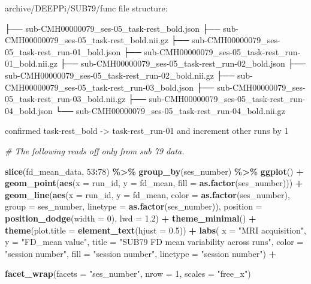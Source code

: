 \documentclass[
]{article}
\newenvironment{Shaded}{\begin{snugshade}}{\end{snugshade}}
\newcommand{\AttributeTok}[1]{\textcolor[rgb]{0.13,0.29,0.53}{#1}}
\newcommand{\CommentTok}[1]{\textcolor[rgb]{0.56,0.35,0.01}{\textit{#1}}}
\newcommand{\DecValTok}[1]{\textcolor[rgb]{0.00,0.00,0.81}{#1}}
\newcommand{\FloatTok}[1]{\textcolor[rgb]{0.00,0.00,0.81}{#1}}
\newcommand{\FunctionTok}[1]{\textcolor[rgb]{0.13,0.29,0.53}{\textbf{#1}}}
\newcommand{\NormalTok}[1]{#1}
\newcommand{\SpecialCharTok}[1]{\textcolor[rgb]{0.81,0.36,0.00}{\textbf{#1}}}
\newcommand{\StringTok}[1]{\textcolor[rgb]{0.31,0.60,0.02}{#1}}
\begin{document}
archive/DEEPPi/SUB79/func file structure:

├── sub-CMH00000079\_ses-05\_task-rest\_bold.json ├──
sub-CMH00000079\_ses-05\_task-rest\_bold.nii.gz ├──
sub-CMH00000079\_ses-05\_task-rest\_run-01\_bold.json ├──
sub-CMH00000079\_ses-05\_task-rest\_run-01\_bold.nii.gz ├──
sub-CMH00000079\_ses-05\_task-rest\_run-02\_bold.json ├──
sub-CMH00000079\_ses-05\_task-rest\_run-02\_bold.nii.gz ├──
sub-CMH00000079\_ses-05\_task-rest\_run-03\_bold.json ├──
sub-CMH00000079\_ses-05\_task-rest\_run-03\_bold.nii.gz ├──
sub-CMH00000079\_ses-05\_task-rest\_run-04\_bold.json └──
sub-CMH00000079\_ses-05\_task-rest\_run-04\_bold.nii.gz

confirmed task-rest\_bold -\textgreater{} task-rest\_run-01 and
increment other runs by 1

\begin{Shaded}
\begin{Highlighting}[]
\CommentTok{\# The following reads off only from sub 79 data. }

\FunctionTok{slice}\NormalTok{(fd\_mean\_data, }\DecValTok{53}\SpecialCharTok{:}\DecValTok{78}\NormalTok{) }\SpecialCharTok{\%\textgreater{}\%}
  \FunctionTok{group\_by}\NormalTok{(ses\_number) }\SpecialCharTok{\%\textgreater{}\%}
    \FunctionTok{ggplot}\NormalTok{() }\SpecialCharTok{+} 
    \FunctionTok{geom\_point}\NormalTok{(}\FunctionTok{aes}\NormalTok{(}\AttributeTok{x =}\NormalTok{ run\_id, }\AttributeTok{y =}\NormalTok{ fd\_mean, }\AttributeTok{fill =} \FunctionTok{as.factor}\NormalTok{(ses\_number))) }\SpecialCharTok{+}
    \FunctionTok{geom\_line}\NormalTok{(}\FunctionTok{aes}\NormalTok{(}\AttributeTok{x =}\NormalTok{ run\_id, }\AttributeTok{y =}\NormalTok{ fd\_mean, }\AttributeTok{color =} \FunctionTok{as.factor}\NormalTok{(ses\_number), }
                  \AttributeTok{group =}\NormalTok{ ses\_number, }\AttributeTok{linetype =} \FunctionTok{as.factor}\NormalTok{(ses\_number)), }
              \AttributeTok{position =} \FunctionTok{position\_dodge}\NormalTok{(}\AttributeTok{width =} \DecValTok{0}\NormalTok{), }\AttributeTok{lwd =} \FloatTok{1.2}\NormalTok{) }\SpecialCharTok{+}
    \FunctionTok{theme\_minimal}\NormalTok{() }\SpecialCharTok{+}
    \FunctionTok{theme}\NormalTok{(}\AttributeTok{plot.title =} \FunctionTok{element\_text}\NormalTok{(}\AttributeTok{hjust =} \FloatTok{0.5}\NormalTok{)) }\SpecialCharTok{+}
    \FunctionTok{labs}\NormalTok{(}
    \AttributeTok{x =} \StringTok{"MRI acquisition"}\NormalTok{, }
    \AttributeTok{y =} \StringTok{"FD\_mean value"}\NormalTok{, }
    \AttributeTok{title =} \StringTok{"SUB79 FD mean variability across runs"}\NormalTok{,}
    \AttributeTok{color =} \StringTok{"session number"}\NormalTok{,}
    \AttributeTok{fill =} \StringTok{"session number"}\NormalTok{,}
    \AttributeTok{linetype =} \StringTok{"session number"}\NormalTok{) }\SpecialCharTok{+} 

    \FunctionTok{facet\_wrap}\NormalTok{(}\AttributeTok{facets =} \StringTok{"ses\_number"}\NormalTok{, }\AttributeTok{nrow =} \DecValTok{1}\NormalTok{, }\AttributeTok{scales =} \StringTok{"free\_x"}\NormalTok{) }
\end{Highlighting}
\end{Shaded}
\end{document}
